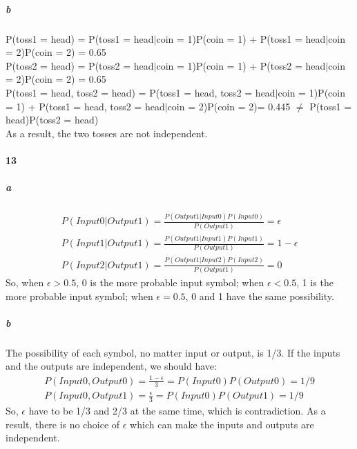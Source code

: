 \documentclass[22pt]{article}
\begin{document}
     \subparagraph{b} P(toss1 = head) = P(toss1 = head$|$coin = 1)P(coin = 1) + P(toss1 = head$|$coin = 2)P(coin = 2) = 0.65\\
	P(toss2 = head) = P(toss2 = head$|$coin = 1)P(coin = 1) + P(toss2 = head$|$coin = 2)P(coin = 2) = 0.65\\
	P(toss1 = head, toss2 = head) = P(toss1 = head, toss2 = head$|$coin = 1)P(coin = 1) + P(toss1 = head, toss2 = head$|$coin = 2)P(coin = 2)= 0.445 $\not=$ P(toss1 = head)P(toss2 = head)\\
	As a result, the two tosses are not independent.

	\paragraph{13}
	\subparagraph{a}
	 \begin{align}
	P(Input0|Output1) = \frac{P(Output1|Input0)P(Input0)}{P(Output1)} = \epsilon \\
	P(Input1|Output1) = \frac{P(Output1|Input1)P(Input1)}{P(Output1)} = 1-\epsilon \\
	P(Input2|Output1) = \frac{P(Output1|Input2)P(Input2)}{P(Output1)} = 0
	\end{align}
	So, when $\epsilon>0.5$, 0 is the more probable input symbol; when $\epsilon<0.5$, 1 is the more probable input symbol; when $\epsilon=0.5$, 0 and 1 have the same possibility.
	\subparagraph{b}
	The possibility of each symbol, no matter input or output, is 1/3. 
	If the inputs and the outputs are independent, we should have:
	\begin{align}
	P(Input0,Output0) = \frac{1- \epsilon}{3} = P(Input0)P(Output0) = 1/9\\
	P(Input0,Output1) = \frac{ \epsilon}{3} = P(Input0)P(Output1) = 1/9
	\end{align}
	So, $\epsilon$ have to be 1/3 and 2/3 at the same time, which is contradiction. As a result, there is no choice of $\epsilon$ which can make the inputs and outputs are independent. 

     
     
\end{document}
